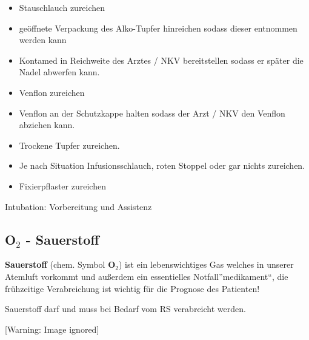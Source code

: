 \documentclass{article}
\makeatletter
\newcommand\gSub[1]{\ensuremath{{}_{\text{#1}}}}
\newcommand\gT[1]{\textbf{\textup{\textcolor[rgb]{0.0,0.5019608,0.0}{#1}}}}
\newcommand\captionof[1]{\def\@captype{#1}\caption}
\makeatother
\begin{document}
\begin{itemize}
\item {\mdseries
Stauschlauch zureichen}

\item {\mdseries
ge\"offnete Verpackung des Alko-Tupfer hinreichen sodass dieser
entnommen werden kann}

\item {\mdseries
Kontamed in Reichweite des  Arztes / NKV bereitstellen sodass er
sp\"ater die Nadel abwerfen kann.}

\item {\mdseries
Venflon zureichen}

\end{itemize}
\begin{itemize}
\item {\mdseries
Venflon an der Schutzkappe halten sodass der Arzt / NKV den Venflon
abziehen kann.}

\end{itemize}
\begin{itemize}
\item {\mdseries
Trockene Tupfer zureichen.}

\item {\mdseries
Je nach Situation Infusionsschlauch, roten Stoppel oder gar nichts
zureichen.  }

\item {\mdseries
Fixierpflaster zureichen}

\end{itemize}
{\mdseries\color[rgb]{0.0,0.0,0.5019608}
Intubation: Vorbereitung und Assistenz }

\subsection[O2 \ - Sauerstoff]{O\gSub{2}  {}- Sauerstoff}
{\mdseries
\gT{Sauerstoff} (chem. Symbol
\gT{O}\gT{\gSub{2}}) ist ein
lebenswichtiges Gas welches in unserer Atemluft vorkommt und
au{\ss}erdem ein essentielles
Notfall{\textquotedblright}medikament{\textquotedblleft}, die
fr\"uhzeitige Verabreichung ist wichtig f\"ur die Prognose des
Patienten!}

{\mdseries
Sauerstoff darf und muss bei Bedarf vom RS verabreicht werden.}

\begin{center}
 [Warning: Image ignored] %
\captionof{figure}[: NEIN!]{: \textbf{NEIN!}}

\end{center}
\end{document}
